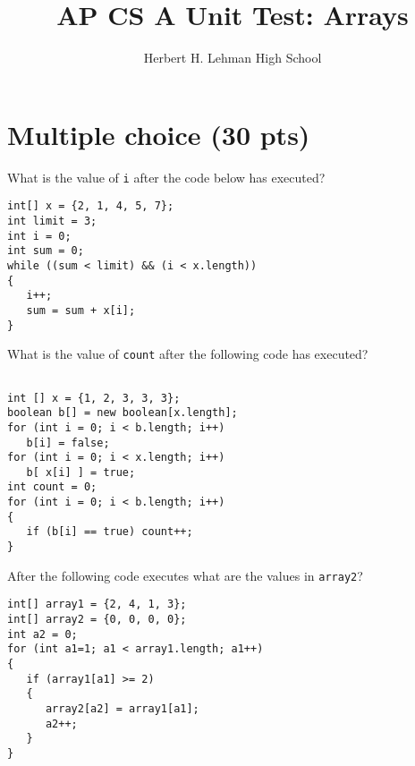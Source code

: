 \documentclass{exam}
\title{AP CS A Unit Test: Arrays}
\author{Herbert H. Lehman High School}
\begin{document}
\maketitle
{}
\vspace{1mm}


\section*{Multiple choice (30 pts)}


\vspace{1mm}

\begin{questions}
\question 
What is the value of \texttt{i} after the  code below has executed?

\begin{lstlisting}
int[] x = {2, 1, 4, 5, 7};
int limit = 3;
int i = 0;
int sum = 0;
while ((sum < limit) && (i < x.length))
{
   i++;
   sum = sum + x[i];
}
\end{lstlisting}

\begin{choices}


\end{choices}

\question
What is the value of \texttt{count} after the following code has executed?

\begin{lstlisting}

int [] x = {1, 2, 3, 3, 3};
boolean b[] = new boolean[x.length];
for (int i = 0; i < b.length; i++)
   b[i] = false;
for (int i = 0; i < x.length; i++)
   b[ x[i] ] = true;
int count = 0;
for (int i = 0; i < b.length; i++)
{
   if (b[i] == true) count++;
}
\end{lstlisting}

\begin{choices}
\end{choices}

\question 
After the following code executes what are the values in \texttt{array2}?

\begin{lstlisting}
int[] array1 = {2, 4, 1, 3};
int[] array2 = {0, 0, 0, 0};
int a2 = 0;
for (int a1=1; a1 < array1.length; a1++)
{
   if (array1[a1] >= 2)
   {
      array2[a2] = array1[a1];
      a2++;
   }
}
\end{lstlisting}


\end{questions}
\end{document}
